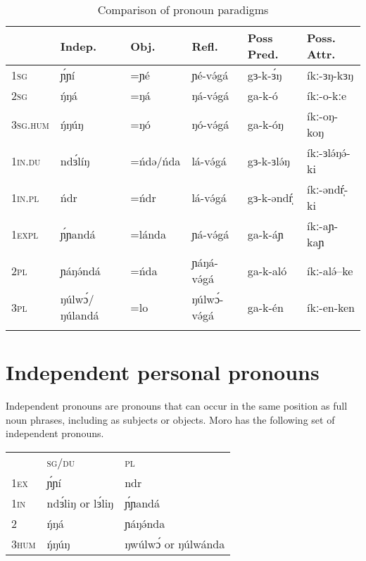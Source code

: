 \begin{table}
  \begin{tabular}{llllll}
    \lsptoprule
				&	Indep. 		& Obj. 			& Refl. 		&  Poss Pred. & Poss. Attr. \\
\midrule
1\textsc{sg}	&		ɲ́ɲí		&	=ɲé			&	ɲé-və́gá		& 	gɜ-k-ɜ́ŋ 	 & íkː-ɜŋ-kɜŋ \\
2\textsc{sg}	&	ŋ́ŋá			& 	=ŋá			& 	ŋá-və́gá		&	ga-k-ó	 & íkː-o-kːe \\
3\textsc{sg.hum}	&	ŋ́ŋúŋ			&	=ŋó			&	ŋó-və́gá		&	ga-k-óŋ	 & íkː-oŋ-koŋ\\
1\textsc{in.du}	&	ndɜ́líŋ		&   =ńdə/ńda	& 	lá-və́gá		&   gɜ-k-ɜlə́ŋ	 & íkː-ɜlə́ŋə́-ki\\
1\textsc{in.pl}	&	ńdr			&	=ńdr		& 	lá-və́gá		&   gɜ-k-əndŕ̩	 & íkː-əndŕ̩-ki \\
1\textsc{expl}	&	ɲ́ɲandá		&	=lánda		&	ɲá-və́gá		&   ga-k-áɲ 	 & íkː-aɲ-kaɲ \\
2\textsc{pl}	&	ɲáŋə́ndá 		&	=ńda 		&	ɲáŋá-və́gá	&	ga-k-aló	 & íkː-alə́--ke	\\
3\textsc{pl}	&	ŋúlwɔ́/ŋúlandá & =lo			& 	ŋúlwɔ́-və́gá 	&	ga-k-én 	 & íkː-en-ken \\
\lspbottomrule 
  \end{tabular}
  \caption{Comparison of pronoun paradigms}
  \label{tab:ch7:2}
\end{table}


\section{Independent personal pronouns}\label{sec:ch7:indep}

Independent pronouns are pronouns that can occur in the same position as full noun phrases, including as subjects or objects. Moro has the following set of independent pronouns.

\ea 
\begin{tabular}[t]{lll}
		 &	\textsc{sg/du} & \textsc{pl} \\
1\textsc{ex}		&	ɲ́ɲí	& ndr\\
1\textsc{in} 	&	ndɜ́liŋ or lɜ́liŋ & ɲ́ɲandá\\
2		&	ŋ́ŋá	& ɲáŋə́nda \\
3\textsc{hum}	&	ŋ́ŋúŋ & ŋwúlwɔ́ or ŋúlwánda\\
\end{tabular}
\z

